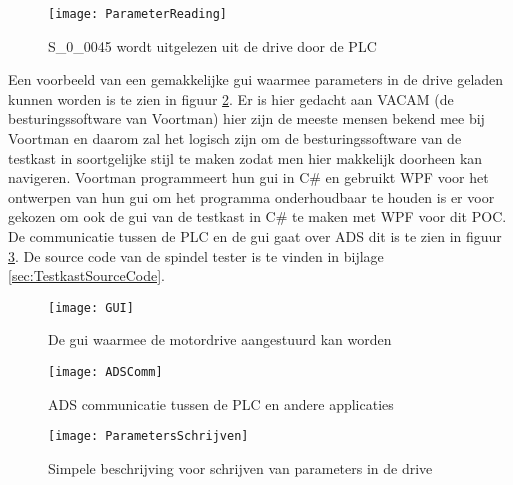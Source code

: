 \begin{figure}[H]
	\centering
	\texttt{[image: ParameterReading]}
	\label{fig:ParameterRead}
	\caption{S\_0\_0045 wordt uitgelezen uit de drive door de \gls{PLC}}
\end{figure}

Een voorbeeld van een gemakkelijke \gls{gui} waarmee parameters in de drive geladen kunnen worden is te zien in figuur \ref{fig:GUIControl}. Er is hier gedacht aan VACAM (de besturingssoftware van Voortman) hier zijn de meeste mensen bekend mee bij Voortman en daarom zal het logisch zijn om de besturingssoftware van de testkast in soortgelijke stijl te maken zodat men hier makkelijk doorheen kan navigeren. Voortman programmeert hun \gls{gui} in C\# en gebruikt \gls{WPF} voor het ontwerpen van hun \gls{gui} om het programma onderhoudbaar te houden is er voor gekozen om ook de \gls{gui} van de testkast in C\# te maken met \gls{WPF} voor dit \gls{POC}. De communicatie tussen de \gls{PLC} en de \gls{gui} gaat over \gls{ADS} dit is te zien in figuur \ref{fig:ADSCom}. De source code van de spindel tester is te vinden in bijlage \ref{sec:TestkastSourceCode}.

\begin{figure}[H]
	\centering
	\texttt{[image: GUI]}
	\label{fig:GUIControl}
	\caption{De \gls{gui} waarmee de motordrive aangestuurd kan worden}
\end{figure}

\begin{figure}[H]
	\centering
	\texttt{[image: ADSComm]}
	\label{fig:ADSCom}
	\caption{\gls{ADS} communicatie tussen de \gls{PLC} en andere applicaties}
\end{figure}

\begin{figure}[H]
	\centering
	\texttt{[image: ParametersSchrijven]}
	\label{fig:ParametersSchrijven}
	\caption{Simpele beschrijving voor schrijven van parameters in de drive}
\end{figure}

